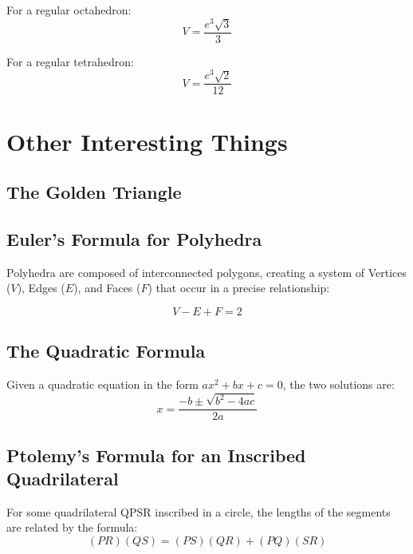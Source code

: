 \documentclass[final, letterpaper, 12pt]{article}
\begin{document}
		For a regular octahedron:
		\begin{equation}
			V = \frac{e^3\sqrt{3}}{3}
		\end{equation}
		
		For a regular tetrahedron:
		\begin{equation}
			V = \frac{e^3\sqrt{2}}{12}
		\end{equation}
\section{Other Interesting Things}
	\subsection{The Golden Triangle}\label{sec: 36-72-72 triangle and value of phi}
	\subsection{Euler's Formula for Polyhedra}\label{sec: a relationship between vertices, edges, and faces in polyhedra}
		Polyhedra are composed of interconnected polygons, creating a system of Vertices ($V$), Edges ($E$), and Faces ($F$) that occur in a precise relationship:
		
		\begin{equation}
			V-E+F = 2
		\end{equation}
	\subsection{The Quadratic Formula}\label{sec: one of the most commonly used things in math team}
		Given a quadratic equation in the form $ax^2+bx+c = 0$, the two solutions are:
		\begin{equation}
			x = \frac{-b\pm \sqrt{b^2-4ac}}{2a}
		\end{equation}
	\subsection{Ptolemy's Formula for an Inscribed Quadrilateral}\label{sec: formula relating the distances between the vertices of an inscribed quadrilateral}
		For some quadrilateral QPSR inscribed in a circle, the lengths of the segments are related by the formula:
		\begin{equation}
			(PR)(QS) = (PS)(QR) + (PQ)(SR)
		\end{equation}
\end{document}
